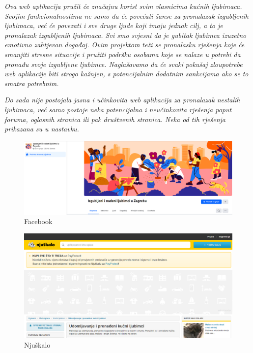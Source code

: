 		\textit{Ova web aplikacija pružit će značajnu korist svim vlasnicima kućnih ljubimaca. Svojim funkcionalnostima ne samo da će povećati šanse za pronalazak izgubljenih ljubimaca, već će povezati i sve druge ljude koji imaju jednak cilj, a to je pronalazak izgubljenih ljubimaca. Svi smo svjesni da je gubitak ljubimca izuzetno emotivno zahtjevan događaj. Ovim projektom teži se pronalasku rješenja koje će smanjiti stresne situacije i pružiti podršku osobama koje se nalaze u potrebi da pronađu svoje izgubljene ljubimce. Naglašavamo da će svaki pokušaj zloupotrebe web aplikacije biti strogo kažnjen, s potencijalnim dodatnim sankcijama ako se to smatra potrebnim.}
		
		\textit{Do sada nije postojala jasna i učinkovita web aplikacija za pronalazak nestalih ljubimaca, već samo postoje neka potencijalna i neučinkovita rješenja poput foruma, oglasnih stranica ili pak društvenih stranica. Neka od tih rješenja prikazana su u nastavku.}
	
		\begin{figure}[H]
			\centering
			\includegraphics[scale=0.3]{slike/Facebook-nestaliLjubimci.PNG}
			\caption{Facebook}
			\label{fig:promjene}
		\end{figure}
	
		\begin{figure}[H]
			\centering
			\includegraphics[scale=0.3]{slike/Njuskalo-nestaliLjubimci.PNG}
			\caption{Njuškalo}
			\label{fig:promjene}
		\end{figure}
		
